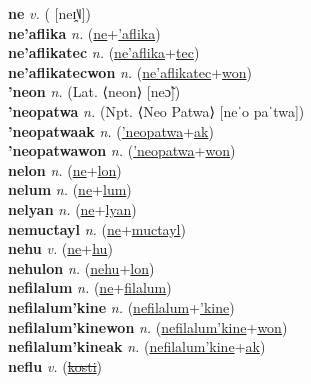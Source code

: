\textbf{ne} \textit{v.} ( [neɪ̯˥˩])
 \label{ne} \\
\textbf{ne'aflika} \textit{n.} (\hyperref[ne]{ne}+\hyperref['aflika]{'aflika})
 \label{ne'aflika} \\
\textbf{ne'aflikatec} \textit{n.} (\hyperref[ne'aflika]{ne'aflika}+\hyperref[tec]{tec})
 \label{ne'aflikatec} \\
\textbf{ne'aflikatecwon} \textit{n.} (\hyperref[ne'aflikatec]{ne'aflikatec}+\hyperref[won]{won})
 \label{ne'aflikatecwon} \\
\textbf{'neon} \textit{n.} (Lat. ⟨neon⟩ [neɔ̃])
 \label{'neon} \\
\textbf{'neopatwa} \textit{n.} (Npt. ⟨Neo Patwa⟩ [neˈo paˈtwa])
 \label{'neopatwa} \\
\textbf{'neopatwaak} \textit{n.} (\hyperref['neopatwa]{'neopatwa}+\hyperref[ak]{ak})
 \label{'neopatwaak} \\
\textbf{'neopatwawon} \textit{n.} (\hyperref['neopatwa]{'neopatwa}+\hyperref[won]{won})
 \label{'neopatwawon} \\
\textbf{nelon} \textit{n.} (\hyperref[ne]{ne}+\hyperref[lon]{lon})
 \label{nelon} \\
\textbf{nelum} \textit{n.} (\hyperref[ne]{ne}+\hyperref[lum]{lum})
 \label{nelum} \\
\textbf{nelyan} \textit{n.} (\hyperref[ne]{ne}+\hyperref[lyan]{lyan})
 \label{nelyan} \\
\textbf{nemuctayl} \textit{n.} (\hyperref[ne]{ne}+\hyperref[muctayl]{muctayl})
 \label{nemuctayl} \\
\textbf{nehu} \textit{v.} (\hyperref[ne]{ne}+\hyperref[hu]{hu})
 \label{nehu} \\
\textbf{nehulon} \textit{n.} (\hyperref[nehu]{nehu}+\hyperref[lon]{lon})
 \label{nehulon} \\
\textbf{nefilalum} \textit{n.} (\hyperref[ne]{ne}+\hyperref[filalum]{filalum})
 \label{nefilalum} \\
\textbf{nefilalum'kine} \textit{n.} (\hyperref[nefilalum]{nefilalum}+\hyperref['kine]{'kine})
 \label{nefilalum'kine} \\
\textbf{nefilalum'kinewon} \textit{n.} (\hyperref[nefilalum'kine]{nefilalum'kine}+\hyperref[won]{won})
 \label{nefilalum'kinewon} \\
\textbf{nefilalum'kineak} \textit{n.} (\hyperref[nefilalum'kine]{nefilalum'kine}+\hyperref[ak]{ak})
 \label{nefilalum'kineak} \\
\textbf{neflu} \textit{v.} (\hyperref[kosti]{\sout{kosti}})
 \label{neflu} \\
